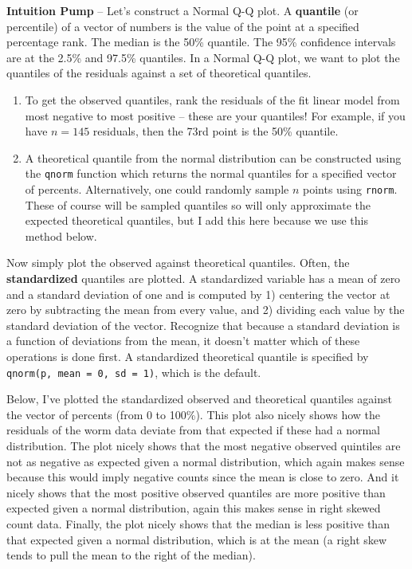 \documentclass[]{book}
\providecommand{\tightlist}{%
  \setlength{\itemsep}{0pt}\setlength{\parskip}{0pt}}
\begin{document}
\textbf{Intuition Pump} -- Let's construct a Normal Q-Q plot. A
\textbf{quantile} (or percentile) of a vector of numbers is the value of
the point at a specified percentage rank. The median is the 50\%
quantile. The 95\% confidence intervals are at the 2.5\% and 97.5\%
quantiles. In a Normal Q-Q plot, we want to plot the quantiles of the
residuals against a set of theoretical quantiles.

\begin{enumerate}
\def\labelenumi{\arabic{enumi}.}
\tightlist
\item
  To get the observed quantiles, rank the residuals of the fit linear
  model from most negative to most positive -- these are your quantiles!
  For example, if you have \(n=145\) residuals, then the 73rd point is
  the 50\% quantile.
\item
  A theoretical quantile from the normal distribution can be constructed
  using the \texttt{qnorm} function which returns the normal quantiles
  for a specified vector of percents. Alternatively, one could randomly
  sample \(n\) points using \texttt{rnorm}. These of course will be
  sampled quantiles so will only approximate the expected theoretical
  quantiles, but I add this here because we use this method below.
\end{enumerate}

Now simply plot the observed against theoretical quantiles. Often, the
\textbf{standardized} quantiles are plotted. A standardized variable has
a mean of zero and a standard deviation of one and is computed by 1)
centering the vector at zero by subtracting the mean from every value,
and 2) dividing each value by the standard deviation of the vector.
Recognize that because a standard deviation is a function of deviations
from the mean, it doesn't matter which of these operations is done
first. A standardized theoretical quantile is specified by
\texttt{qnorm(p,\ mean\ =\ 0,\ sd\ =\ 1)}, which is the default.

Below, I've plotted the standardized observed and theoretical quantiles
against the vector of percents (from 0 to 100\%). This plot also nicely
shows how the residuals of the worm data deviate from that expected if
these had a normal distribution. The plot nicely shows that the most
negative observed quintiles are not as negative as expected given a
normal distribution, which again makes sense because this would imply
negative counts since the mean is close to zero. And it nicely shows
that the most positive observed quantiles are more positive than
expected given a normal distribution, again this makes sense in right
skewed count data. Finally, the plot nicely shows that the median is
less positive than that expected given a normal distribution, which is
at the mean (a right skew tends to pull the mean to the right of the
median).
\end{document}
